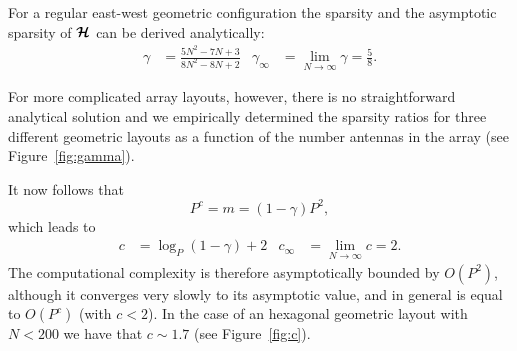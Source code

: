 \documentclass[useAMS,usenatbib]{mn2e}
\newcommand{\bmH}{\bmath{\mathcal{H}}}
\begin{document}
For a regular east-west geometric configuration the sparsity and the asymptotic sparsity of $\bmH$ can be derived analytically:
\begin{align}
\gamma &= \frac{5N^2-7N+3}{8N^2-8N+2} & \gamma_{\infty} &= \lim_{N\rightarrow \infty}\gamma = \frac{5}{8} \label{eq:gamma}. 
\end{align}

For more complicated array layouts, however, there is no straightforward analytical solution and we empirically determined the sparsity ratios for three different geometric layouts as a function of the number antennas in the array (see Figure~\ref{fig:gamma}). 

It now follows that 
\begin{equation}
P^{c} = m = (1 - \gamma)P^2,
\end{equation}
which leads to
\begin{align}
c &= \log_{P}(1 - \gamma) + 2 & c_{\infty} &= \lim_{N\rightarrow \infty} c = 2. \label{eq:c}
\end{align}
The computational complexity is therefore asymptotically bounded by $O(P^2)$, although it converges very slowly to its asymptotic value, and in general is equal to $O(P^{c})$ (with $c<2$). In the case of an hexagonal geometric layout with $N < 200$ we have that $c \sim 1.7$ (see Figure~\ref{fig:c}).
\end{document}
